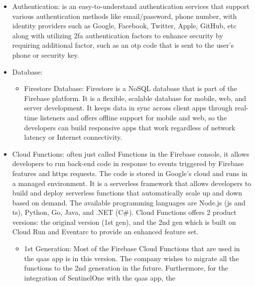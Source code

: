 \begin{itemize}
      \item Authentication: is an easy-to-understand authentication services that support various authentication
            methods like email/password, phone number, with identity providers such as Google, Facebook, Twitter,
            Apple, GitHub, \acrshort{etc}
            along with utilizing \acrshort{2fa} authentication factors to enhance security by requiring additional
            factor, such as an \acrshort{otp} code that is sent to the user's phone or security key.
      \item Database:
            \begin{itemize}
                  \item Firestore Database: Firestore is a \gls{NoSQL} database that is part of the Firebase
                        platform. It is a flexible, scalable database for mobile, web, and server development. It keeps
                        data in sync across client apps through real-time listeners and offers offline support for mobile
                        and web, so the developers can build responsive apps that work regardless of network latency or
                        Internet connectivity.
            \end{itemize}
      \item Cloud Functions: often just called Functions in the Firebase console, it allows developers to run
            back-end code in response to events triggered by Firebase features and \acrshort{https} requests.
            The code is stored in Google's cloud and runs in a managed environment. It is a serverless framework
            that allows developers to build and deploy serverless functions that automatically scale up and down
            based on demand. The available programming languages are Node.js (\acrshort{js} and \acrshort{ts}),
            Python, Go, Java, and .NET (C\#). Cloud Functions offers 2 product versions: the original version
            (1st gen), and the 2nd gen which is built on Cloud Run and Eventarc to provide an enhanced feature set.
            \begin{itemize}
                  \item 1st Generation: Most of the Firebase Cloud Functions that are used in the \acrshort{qaas} app
                        is in this version. The company wishes to migrate all the functions to the 2nd generation in
                        the future. Furthermore, for the integration of SentinelOne with the \acrshort{qaas} app, the

\end{itemize}
\end{itemize}
